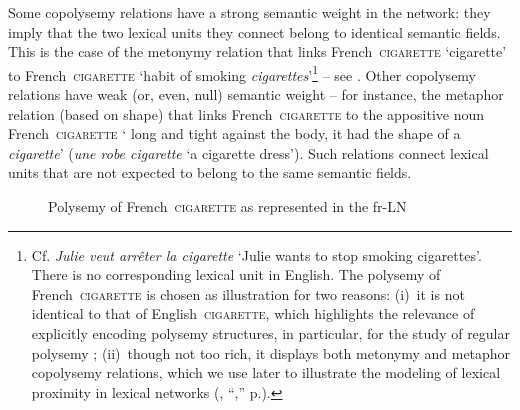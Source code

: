Some copolysemy relations have a strong semantic weight in the network: they imply that the two lexical units they connect belong to identical semantic fields. This is the case of the metonymy relation that links {\smaller French}~\textsc{cigarette} `cigarette'\label{txt:CIGARETTE} to {\smaller French}~\textsc{cigarette} `habit of smoking \textit{cigarettes}'\footnote{Cf. \textit{Julie veut arrêter la cigarette} `Julie wants to stop smoking cigarettes'. There is no corresponding lexical unit in English. The polysemy of {\smaller French}~\textsc{cigarette} is chosen as illustration for two reasons: (i)~it is not identical to that of {\smaller English}~\textsc{cigarette}, which highlights the relevance of explicitly encoding polysemy structures, in particular, for the study of regular polysemy \parencite{Apresjan1974,PetersWPetersI2000,Polguere2022a}; (ii)~though not too rich, it displays both metonymy and metaphor copolysemy relations, which we use later to illustrate the modeling of lexical proximity in lexical networks (, ``,'' p.\thinspace\pageref{par:lexicalSpaces}).} -- see . Other copolysemy relations have weak (or, even, null) semantic weight -- for instance, the metaphor relation (based on shape) that links {\smaller French}~\textsc{cigarette} to the appositive noun {\smaller French}~\textsc{cigarette} ` long and tight against the body,  it had the shape of a \textit{cigarette}' (\textit{une robe cigarette} `a cigarette dress'). Such relations connect lexical units that are not expected to belong to the same semantic fields.

\begin{figure}

\caption{Polysemy of {\smaller French}~\textsc{cigarette} as represented in the fr-LN}\label{fig:polysemyCIGARETTE}
\end{figure}

